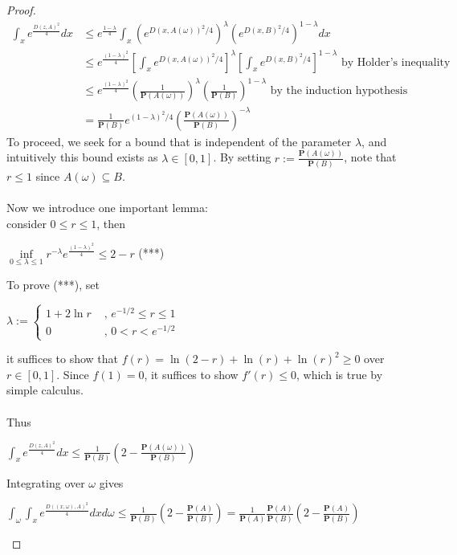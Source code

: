\documentclass{article}
\begin{document}
\begin{proof}
\begin{align*}
        \int_x e^{\frac{D(z,A)^2}{4}}dx &\leq e^{\frac{1-\lambda}{4}} \int_x \left( e^{D(x, A(\omega))^2 /4}\right)^\lambda \left( e^{D(x,B)^2 /4}\right)^{1-\lambda} dx\\
        &\leq e^{\frac{(1-\lambda)^2}{4}} \left[ \int_x e^{D(x, A(\omega))^2 /4}\right]^\lambda \left[ \int_x e^{D(x, B)^2/4}\right]^{1-\lambda} \text{ by Holder's inequality}\\
        &\leq e^{\frac{(1-\lambda)^2}{4}} \left( \frac{1}{\mathbf{P}(A(\omega))}\right)^\lambda \left( \frac{1}{\mathbf{P}(B)}\right)^{1-\lambda} \text{ by the induction hypothesis} \\
        &= \frac{1}{\mathbf{P}(B)} e^{(1-\lambda)^2/4}\left( \frac{\mathbf{P}(A(\omega))}{\mathbf{P}(B)}\right)^{-\lambda}
    \end{align*}
    To proceed, we seek for a bound that is independent of the parameter $\lambda$, and intuitively this bound exists as $\lambda \in [0, 1]$. By setting $r := \frac{\mathbf{P}(A(\omega))}{\mathbf{P}(B)}$, note that $r \leq 1$ since $A(\omega) \subseteq B$.\\
    \\
    Now we introduce one important lemma:\\
    consider $0 \leq r \leq 1$, then
    \begin{center}
        $\inf\limits_{0\leq \lambda \leq 1}r^{-\lambda}e^{\frac{(1-\lambda)^2}{4}} \leq 2 - r$ (***)
    \end{center}
    To prove (***), set 
    \begin{center}
        $ \lambda := 
    \begin{cases}
        1+2\ln r &\text{ , }e^{-1/2} \leq r \leq 1\\
        0      &\text{ , } 0 < r<e^{-1/2}
    \end{cases}
    $
    \end{center}
    it suffices to show that $f(r) = \ln(2-r) + \ln(r) + \ln(r)^2 \geq 0$ over $r \in [0, 1]$. Since $f(1) = 0$, it suffices to show $f'(r) \leq 0$, which is true by simple calculus.\\
    \\
    Thus 
    \begin{center}
        $\int_x e^{\frac{D(z,A)^2}{4}}dx \leq \frac{1}{\mathbf{P}(B)}\left(2 - \frac{\mathbf{P}(A(\omega))}{\mathbf{P}(B)}\right) $
    \end{center}
    Integrating over $\omega$ gives
    \begin{center}
       $\int_\omega \int_x e^{\frac{D((x, \omega),A)^2}{4}}dx d\omega \leq \frac{1}{\mathbf{P}(B)}\left(2 - \frac{\mathbf{P}(A)}{\mathbf{P}(B)}\right) = \frac{1}{\mathbf{P}(A)} \frac{\mathbf{P}(A)}{\mathbf{P}(B)} \left(2 - \frac{\mathbf{P}(A)}{\mathbf{P}(B)}\right)$

\end{center}
\end{proof}
\end{document}
